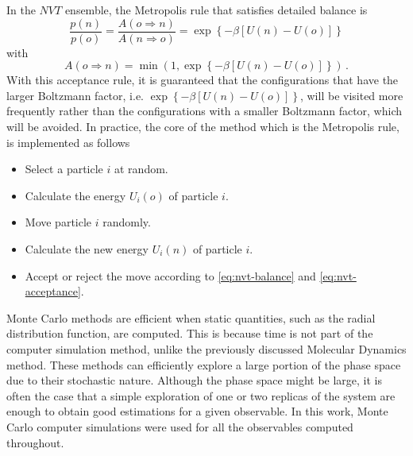 In the $NVT$ ensemble, the Metropolis rule that satisfies detailed balance is
\begin{equation}
    \frac{p(n)}{p(o)} = \frac{A(o \Longrightarrow n)}{A(n \Longrightarrow o)} =
    \exp{ \left\{ -\beta \left[U(n) - U(o)\right] \right\} }
    \label{eq:nvt-balance}
\end{equation}
with
\begin{equation}
    A(o \Longrightarrow n) = \min{ \left(1, \exp{ \left\{ -\beta \left[U(n) - U(o)\right] \right\} } \right)} 
    \, .
    \label{eq:nvt-acceptance}
\end{equation}
With this acceptance rule, it is guaranteed that the configurations that have the larger
Boltzmann factor, i.e. $\exp{ \left\{ -\beta \left[U(n) - U(o)\right] \right\} }$, 
will be visited more frequently rather than the configurations with a smaller
Boltzmann factor, which will be avoided.
In practice, the core of the method which is the Metropolis rule, is implemented as follows
\newpage
\begin{itemize}
    \item Select a particle $i$ at random.
    \item Calculate the energy $U_{i}(o)$ of particle $i$.
    \item Move particle $i$ randomly.
    \item Calculate the new energy $U_{i}(n)$ of particle $i$.
    \item Accept or reject the move according to \autoref{eq:nvt-balance} and \autoref{eq:nvt-acceptance}.
\end{itemize}
Monte Carlo methods are efficient when static quantities, such as the radial distribution
function, are computed. This is because time is not part of the computer simulation method,
unlike the previously discussed Molecular Dynamics method.
These methods can efficiently explore a large portion of the phase
space due to their stochastic nature. Although the phase space might be large, it is often
the case that a simple exploration of one or two replicas of the system are enough
to obtain good estimations for a given observable. In this work, Monte Carlo computer 
simulations were used for all the observables computed throughout.

